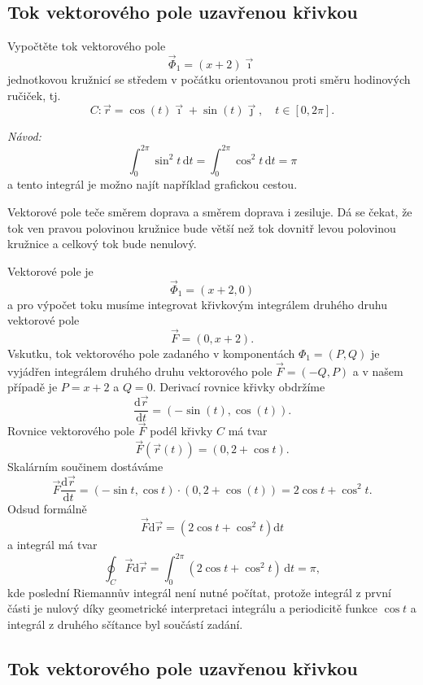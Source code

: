 \konec


\stranka



\subsection{Tok vektorového pole uzavřenou křivkou}

Vypočtěte tok vektorového pole $$\vec \Phi_1=(x+2)\vec\imath$$ jednotkovou kružnicí se středem v počátku orientovanou proti směru hodinových ručiček, tj. $$C\colon \vec r=\cos(t)\vec \imath+\sin(t)\vec\jmath, \quad t\in[0,2\pi].$$


\textit{Návod:} $$\int_0^{2\pi}\sin^2 t\,\mathrm dt=\int_0^{2\pi}\cos^2 t\,\mathrm dt= \pi$$
a tento integrál je možno najít například grafickou cestou.

\reseni
Vektorové pole teče směrem doprava a směrem doprava i zesiluje. Dá se čekat, že tok ven pravou polovinou kružnice bude větší než tok dovnitř levou polovinou kružnice a celkový tok bude nenulový.

Vektorové pole je $$\vec \Phi_1=(x+2,0)$$ a pro výpočet toku musíme integrovat křivkovým integrálem druhého druhu vektorové pole $$\vec F=(0,x+2).$$
Vskutku, tok vektorového pole zadaného v komponentách $\Phi_1=(P,Q)$ je vyjádřen integrálem druhého druhu vektorového pole $\vec F=(-Q,P)$ a v našem případě je $P=x+2$ a $Q=0$. Derivací rovnice křivky obdržíme
$$\frac{\mathrm d\vec r}{\mathrm dt}=(-\sin (t),\cos (t)).$$
Rovnice vektorového pole $\vec F$ podél křivky $C$ má tvar
$$\vec F(\vec r(t))=(0,2+\cos t).$$
Skalárním součinem dostáváme
$$\vec F \frac{\mathrm d\vec r}{\mathrm dt}=
(-\sin t,\cos t)\cdot (0,2+\cos (t)) = 2\cos t+\cos^2 t .
$$
Odsud formálně $$\vec F\mathrm d\vec r=(2\cos t+\cos^2 t)\mathrm dt$$
a integrál má tvar
$$\oint_C\vec F\mathrm d\vec r=\int_0^{2\pi }(2\cos t+\cos^2 t)\,\mathrm dt= \pi ,$$
kde poslední Riemannův integrál není nutné počítat, protože integrál z první části je nulový díky geometrické interpretaci integrálu a periodicitě funkce $\cos t$ a integrál z druhého sčítance byl součástí zadání.


\konec

\stranka



\subsection{Tok vektorového pole uzavřenou křivkou}

